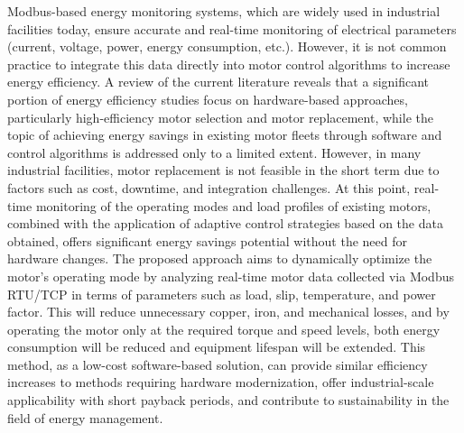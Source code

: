 Modbus-based energy monitoring systems, which are widely used in industrial facilities today, ensure accurate and real-time monitoring of electrical parameters (current, voltage, power, energy consumption, etc.). However, it is not common practice to integrate this data directly into motor control algorithms to increase energy efficiency. A review of the current literature reveals that a significant portion of energy efficiency studies focus on hardware-based approaches, particularly high-efficiency motor selection and motor replacement, while the topic of achieving energy savings in existing motor fleets through software and control algorithms is addressed only to a limited extent. However, in many industrial facilities, motor replacement is not feasible in the short term due to factors such as cost, downtime, and integration challenges. At this point, real-time monitoring of the operating modes and load profiles of existing motors, combined with the application of adaptive control strategies based on the data obtained, offers significant energy savings potential without the need for hardware changes. The proposed approach aims to dynamically optimize the motor's operating mode by analyzing real-time motor data collected via Modbus RTU/TCP in terms of parameters such as load, slip, temperature, and power factor. This will reduce unnecessary copper, iron, and mechanical losses, and by operating the motor only at the required torque and speed levels, both energy consumption will be reduced and equipment lifespan will be extended. This method, as a low-cost software-based solution, can provide similar efficiency increases to methods requiring hardware modernization, offer industrial-scale applicability with short payback periods, and contribute to sustainability in the field of energy management.  


\clearpage